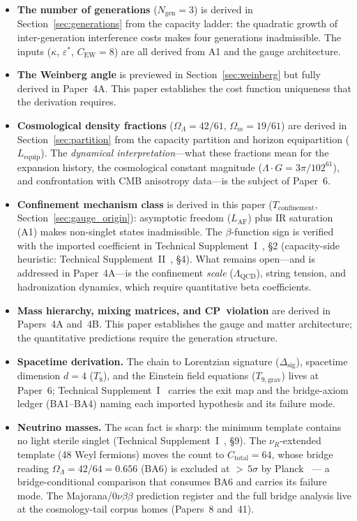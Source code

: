 \documentclass[11pt]{article}
\newenvironment{varlist}{\begin{itemize}[nosep,leftmargin=2em]}{\end{itemize}}
\begin{document}
\begin{varlist}
\item \textbf{The number of generations} ($N_{\mathrm{gen}} = 3$) is derived in Section~\ref{sec:generations} from the capacity ladder: the quadratic growth of inter-generation interference costs makes four generations inadmissible.  The inputs ($\kappa$, $\varepsilon^*$, $C_{\mathrm{EW}} = 8$) are all derived from A1 and the gauge architecture.
\item \textbf{The Weinberg angle} is previewed in Section~\ref{sec:weinberg} but fully derived in Paper~4A.  This paper establishes the cost function uniqueness that the derivation requires.
\item \textbf{Cosmological density fractions} ($\Omega_\Lambda = 42/61$, $\Omega_m = 19/61$) are derived in Section~\ref{sec:partition} from the capacity partition and horizon equipartition ($L_{\mathrm{equip}}$).  The \emph{dynamical interpretation}---what these fractions mean for the expansion history, the cosmological constant magnitude ($\Lambda \cdot G = 3\pi/102^{61}$), and confrontation with CMB anisotropy data---is the subject of Paper~6.
\item \textbf{Confinement mechanism class} is derived in this paper ($T_{\mathrm{confinement}}$, Section~\ref{sec:gauge_origin}): asymptotic freedom ($L_{\mathrm{AF}}$) plus IR saturation (A1) makes non-singlet states inadmissible.  The $\beta$-function sign is verified with the imported coefficient in Technical Supplement~I~\cite{BrookeP2Supplement}, \S2 (capacity-side heuristic: Technical Supplement~II~\cite{BrookeP2FoundSupplement}, \S4).  What remains open---and is addressed in Paper~4A---is the confinement \emph{scale} ($\Lambda_{\mathrm{QCD}}$), string tension, and hadronization dynamics, which require quantitative beta coefficients.
\item \textbf{Mass hierarchy, mixing matrices, and CP~violation} are derived in Papers~4A and~4B.  This paper establishes the gauge and matter architecture; the quantitative predictions require the generation structure.
\item \textbf{Spacetime derivation.}  The chain to Lorentzian signature ($\Delta_{\mathrm{sig}}$), spacetime dimension $d = 4$ ($T_8$), and the Einstein field equations ($T_{9,\mathrm{grav}}$) lives at Paper~6; Technical Supplement~I~\cite{BrookeP2Supplement} carries the exit map and the bridge-axiom ledger (BA1--BA4) naming each imported hypothesis and its failure mode.
\item \textbf{Neutrino masses.}  The scan fact is sharp: the minimum template contains no light sterile singlet (Technical Supplement~I~\cite{BrookeP2Supplement}, \S9).  The $\nu_R$-extended template (48 Weyl fermions) moves the count to $C_{\mathrm{total}} = 64$, whose bridge reading $\Omega_\Lambda = 42/64 = 0.656$ (BA6) is excluded at ${>}\,5\sigma$ by Planck~\cite{Planck2020} --- a bridge-conditional comparison that consumes BA6 and carries its failure mode.  The Majorana/$0\nu\beta\beta$ prediction register and the full bridge analysis live at the cosmology-tail corpus homes (Papers~8 and~41).
\end{varlist}
\end{document}
